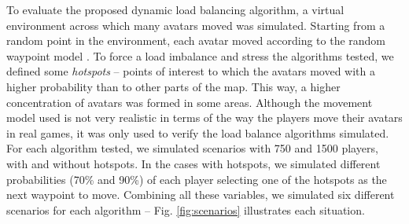 \documentclass[acmjacm]{acmtrans2m}
\newcommand{\figurecaption}{Fig.}
\begin{document}
To evaluate the proposed dynamic load balancing algorithm, a virtual environment across which many avatars moved was simulated. Starting from a random point in the environment, each avatar moved according to the random waypoint model \cite{bettstetter2004spr}. To force a load imbalance and stress the algorithms tested, we defined some \emph{hotspots} -- points of interest to which the avatars moved with a higher probability than to other parts of the map. This way, a higher concentration of avatars was formed in some areas. Although the movement model used is not very realistic in terms of the way the players move their avatars in real games, it was only used to verify the load balance algorithms simulated. For each algorithm tested, we simulated scenarios with 750 and 1500 players, with and without hotspots. In the cases with hotspots, we simulated different probabilities (70\% and 90\%) of each player selecting one of the hotspots as the next waypoint to move. Combining all these variables, we simulated six different scenarios for each algorithm -- \figurecaption{} \ref{fig:scenarios} illustrates each situation.
\end{document}
